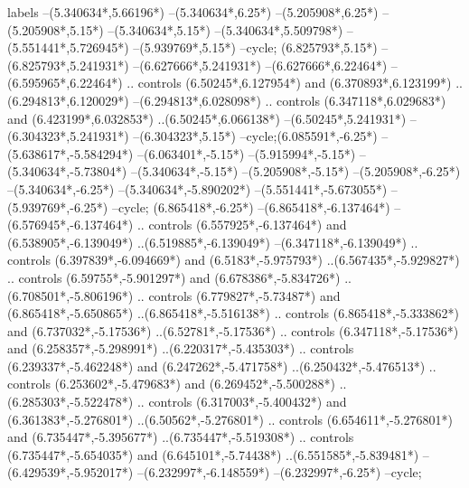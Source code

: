 {\begin{scope}[x=1mm,y=1mm,line width=\SCstroke mm,line cap=round,line join=round]
\begin{SCpart}{labels}
--({5.340634*\SCF},{5.66196*\SCF})
--({5.340634*\SCF},{6.25*\SCF})
--({5.205908*\SCF},{6.25*\SCF})
--({5.205908*\SCF},{5.15*\SCF})
--({5.340634*\SCF},{5.15*\SCF})
--({5.340634*\SCF},{5.509798*\SCF})
--({5.551441*\SCF},{5.726945*\SCF})
--({5.939769*\SCF},{5.15*\SCF})
--cycle;
 ({6.825793*\SCF},{5.15*\SCF})
--({6.825793*\SCF},{5.241931*\SCF})
--({6.627666*\SCF},{5.241931*\SCF})
--({6.627666*\SCF},{6.22464*\SCF})
--({6.595965*\SCF},{6.22464*\SCF})
.. controls ({6.50245*\SCF},{6.127954*\SCF}) and ({6.370893*\SCF},{6.123199*\SCF}) ..({6.294813*\SCF},{6.120029*\SCF})
--({6.294813*\SCF},{6.028098*\SCF})
.. controls ({6.347118*\SCF},{6.029683*\SCF}) and ({6.423199*\SCF},{6.032853*\SCF}) ..({6.50245*\SCF},{6.066138*\SCF})
--({6.50245*\SCF},{5.241931*\SCF})
--({6.304323*\SCF},{5.241931*\SCF})
--({6.304323*\SCF},{5.15*\SCF})
--cycle; ({6.085591*\SCF},{-6.25*\SCF})
--({5.638617*\SCF},{-5.584294*\SCF})
--({6.063401*\SCF},{-5.15*\SCF})
--({5.915994*\SCF},{-5.15*\SCF})
--({5.340634*\SCF},{-5.73804*\SCF})
--({5.340634*\SCF},{-5.15*\SCF})
--({5.205908*\SCF},{-5.15*\SCF})
--({5.205908*\SCF},{-6.25*\SCF})
--({5.340634*\SCF},{-6.25*\SCF})
--({5.340634*\SCF},{-5.890202*\SCF})
--({5.551441*\SCF},{-5.673055*\SCF})
--({5.939769*\SCF},{-6.25*\SCF})
--cycle;
 ({6.865418*\SCF},{-6.25*\SCF})
--({6.865418*\SCF},{-6.137464*\SCF})
--({6.576945*\SCF},{-6.137464*\SCF})
.. controls ({6.557925*\SCF},{-6.137464*\SCF}) and ({6.538905*\SCF},{-6.139049*\SCF}) ..({6.519885*\SCF},{-6.139049*\SCF})
--({6.347118*\SCF},{-6.139049*\SCF})
.. controls ({6.397839*\SCF},{-6.094669*\SCF}) and ({6.5183*\SCF},{-5.975793*\SCF}) ..({6.567435*\SCF},{-5.929827*\SCF})
.. controls ({6.59755*\SCF},{-5.901297*\SCF}) and ({6.678386*\SCF},{-5.834726*\SCF}) ..({6.708501*\SCF},{-5.806196*\SCF})
.. controls ({6.779827*\SCF},{-5.73487*\SCF}) and ({6.865418*\SCF},{-5.650865*\SCF}) ..({6.865418*\SCF},{-5.516138*\SCF})
.. controls ({6.865418*\SCF},{-5.333862*\SCF}) and ({6.737032*\SCF},{-5.17536*\SCF}) ..({6.52781*\SCF},{-5.17536*\SCF})
.. controls ({6.347118*\SCF},{-5.17536*\SCF}) and ({6.258357*\SCF},{-5.298991*\SCF}) ..({6.220317*\SCF},{-5.435303*\SCF})
.. controls ({6.239337*\SCF},{-5.462248*\SCF}) and ({6.247262*\SCF},{-5.471758*\SCF}) ..({6.250432*\SCF},{-5.476513*\SCF})
.. controls ({6.253602*\SCF},{-5.479683*\SCF}) and ({6.269452*\SCF},{-5.500288*\SCF}) ..({6.285303*\SCF},{-5.522478*\SCF})
.. controls ({6.317003*\SCF},{-5.400432*\SCF}) and ({6.361383*\SCF},{-5.276801*\SCF}) ..({6.50562*\SCF},{-5.276801*\SCF})
.. controls ({6.654611*\SCF},{-5.276801*\SCF}) and ({6.735447*\SCF},{-5.395677*\SCF}) ..({6.735447*\SCF},{-5.519308*\SCF})
.. controls ({6.735447*\SCF},{-5.654035*\SCF}) and ({6.645101*\SCF},{-5.74438*\SCF}) ..({6.551585*\SCF},{-5.839481*\SCF})
--({6.429539*\SCF},{-5.952017*\SCF})
--({6.232997*\SCF},{-6.148559*\SCF})
--({6.232997*\SCF},{-6.25*\SCF})
--cycle;
\end{SCpart}
\end{scope}
}
